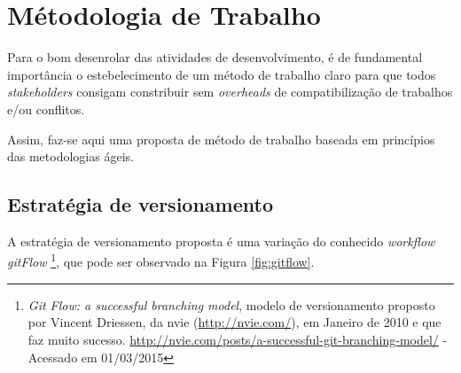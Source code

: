 \section{Métodologia de Trabalho}
Para o bom desenrolar das atividades de desenvolvimento, é de fundamental importância o estebelecimento de um método de trabalho claro para que todos \textit{stakeholders} consigam constribuir sem \textit{overheads} de compatibilização de trabalhos e/ou conflitos.

Assim, faz-se aqui uma proposta de método de trabalho baseada em princípios das metodologias ágeis.
\subsection{Estratégia de versionamento}
A estratégia de versionamento proposta é uma variação do conhecido \textit{workflow} \textit{gitFlow}%
\footnote{\textit{Git Flow: a successful branching model}, modelo de versionamento proposto por Vincent Driessen, da nvie (\url{http://nvie.com/}), em Janeiro de 2010 e que faz muito sucesso. \url{http://nvie.com/posts/a-successful-git-branching-model/} - Acessado em 01/03/2015}, que pode ser observado na Figura \ref{fig:gitflow}.

